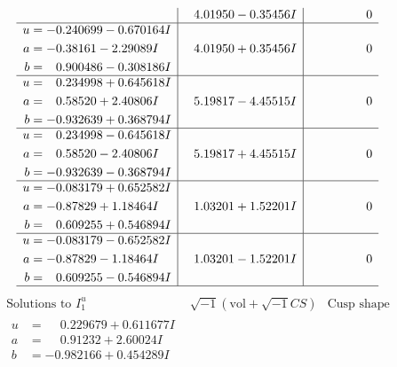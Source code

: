 \documentclass[1p]{elsarticle_modified}
\theoremstyle{definition}
\newcommand{\I}{\sqrt{-1}}
\begin{document}
$$\begin{array}{c|c|c}
 & \phantom{-}4.01950 - 0.35456 I & \phantom{-0.000000 } 0 \\ \hline\begin{aligned}
u &= -0.240699 - 0.670164 I \\
a &= -0.38161 - 2.29089 I \\
b &= \phantom{-}0.900486 - 0.308186 I\end{aligned}
 & \phantom{-}4.01950 + 0.35456 I & \phantom{-0.000000 } 0 \\ \hline\begin{aligned}
u &= \phantom{-}0.234998 + 0.645618 I \\
a &= \phantom{-}0.58520 + 2.40806 I \\
b &= -0.932639 + 0.368794 I\end{aligned}
 & \phantom{-}5.19817 - 4.45515 I & \phantom{-0.000000 } 0 \\ \hline\begin{aligned}
u &= \phantom{-}0.234998 - 0.645618 I \\
a &= \phantom{-}0.58520 - 2.40806 I \\
b &= -0.932639 - 0.368794 I\end{aligned}
 & \phantom{-}5.19817 + 4.45515 I & \phantom{-0.000000 } 0 \\ \hline\begin{aligned}
u &= -0.083179 + 0.652582 I \\
a &= -0.87829 + 1.18464 I \\
b &= \phantom{-}0.609255 + 0.546894 I\end{aligned}
 & \phantom{-}1.03201 + 1.52201 I & \phantom{-0.000000 } 0 \\ \hline\begin{aligned}
u &= -0.083179 - 0.652582 I \\
a &= -0.87829 - 1.18464 I \\
b &= \phantom{-}0.609255 - 0.546894 I\end{aligned}
 & \phantom{-}1.03201 - 1.52201 I & \phantom{-0.000000 } 0\\
 \hline 
 \end{array}$$\newpage$$\begin{array}{c|c|c}  
\text{Solutions to }I^u_{1}& \I (\text{vol} + \sqrt{-1}CS) & \text{Cusp shape}\\
 \hline 
\begin{aligned}
u &= \phantom{-}0.229679 + 0.611677 I \\
a &= \phantom{-}0.91232 + 2.60024 I \\
b &= -0.982166 + 0.454289 I\end{aligned}

\end{array}$$
\end{document}
